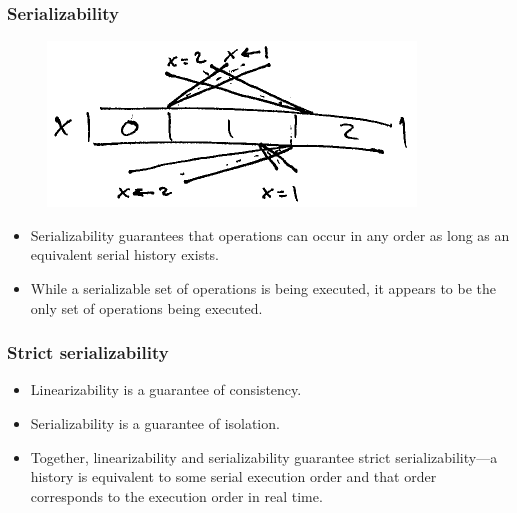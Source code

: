\documentclass{beamer}
\begin{document}
  \begin{frame}
    \frametitle{Serializability}

    \begin{figure}
      \centering
      \includegraphics{serializability}
    \end{figure}

    \begin{itemize}
      \item Serializability guarantees that operations can occur in any order as long as an equivalent serial history exists.
      \item While a serializable set of operations is being executed, it appears to be the only set of operations being executed.
    \end{itemize}
  \end{frame}

  \begin{frame}
    \frametitle{Strict serializability}

    \begin{itemize}
      \item Linearizability is a guarantee of consistency.
      \item Serializability is a guarantee of isolation.
      \item Together, linearizability and serializability guarantee strict serializability---a history is equivalent to some serial execution order and that order corresponds to the execution order in real time.
    \end{itemize}
  \end{frame}
 
\end{document}
